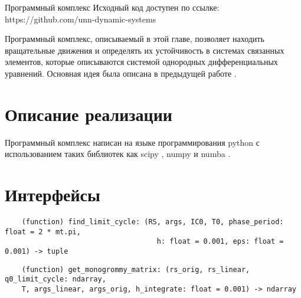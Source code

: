 \begin{chapter}{Программный комплекс}
	Исходный код доступен по ссылке: https://github.com/unn-dynamic-systems
	
	Программный комплекс, описываемый в этой главе, позволяет находить вращательные движения и
	определять их устойчивость в системах связанных элементов, которые описываются системой однородных
	дифференциальных уравнений. Основная идея была описана в предыдущей работе \cite{Khorkin}.


\section{Описание реализации}
Программный комплекс написан на языке программирования python с использованием таких
библиотек как scipy \cite{scipy}, numpy \cite{numpy} и numba \cite{numba}.
\section{Интерфейсы}

\begin{verbatim}
	(function) find_limit_cycle: (RS, args, IC0, T0, phase_period: float = 2 * mt.pi,
									h: float = 0.001, eps: float = 0.001) -> tuple
\end{verbatim}

\begin{verbatim}
	(function) get_monogrommy_matrix: (rs_orig, rs_linear, q0_limit_cycle: ndarray,
	T, args_linear, args_orig, h_integrate: float = 0.001) -> ndarray
\end{verbatim}

\end{chapter}